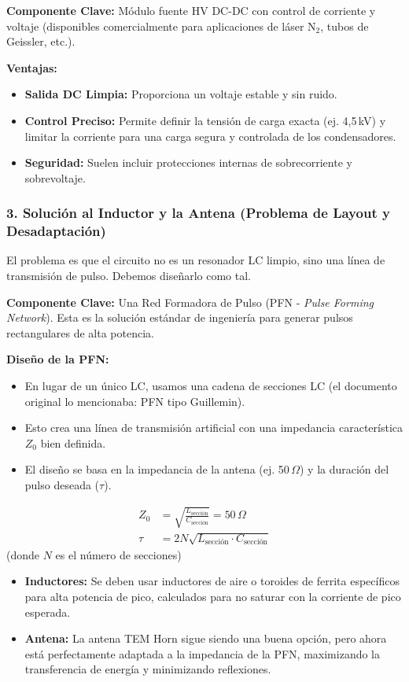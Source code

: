 \documentclass[12pt,a4paper]{article}
\begin{document}
\textbf{Componente Clave:} Módulo fuente HV DC-DC con control de corriente y voltaje (disponibles comercialmente para aplicaciones de láser $\text{N}_2$, tubos de Geissler, etc.).

\textbf{Ventajas:}
\begin{itemize}
    \item \textbf{Salida DC Limpia:} Proporciona un voltaje estable y sin ruido.
    \item \textbf{Control Preciso:} Permite definir la tensión de carga exacta (ej. 4,5\,kV) y limitar la corriente para una carga segura y controlada de los condensadores.
    \item \textbf{Seguridad:} Suelen incluir protecciones internas de sobrecorriente y sobrevoltaje.
\end{itemize}

\subsubsection{3. Solución al Inductor y la Antena (Problema de Layout y Desadaptación)}
El problema es que el circuito no es un resonador LC limpio, sino una línea de transmisión de pulso. Debemos diseñarlo como tal.

\textbf{Componente Clave:} Una Red Formadora de Pulso (PFN - \textit{Pulse Forming Network}). Esta es la solución estándar de ingeniería para generar pulsos rectangulares de alta potencia.

\textbf{Diseño de la PFN:}
\begin{itemize}
    \item En lugar de un único LC, usamos una cadena de secciones LC (el documento original lo mencionaba: PFN tipo Guillemin).
    \item Esto crea una línea de transmisión artificial con una impedancia característica $Z_0$ bien definida.
    \item El diseño se basa en la impedancia de la antena (ej. 50\,$\Omega$) y la duración del pulso deseada ($\tau$).
\end{itemize}
\begin{align}
    Z_0 &= \sqrt{\frac{L_{\text{sección}}}{C_{\text{sección}}}} = 50\,\Omega \\
    \tau &= 2N \sqrt{L_{\text{sección}} \cdot C_{\text{sección}}}
\end{align}
(donde $N$ es el número de secciones)

\begin{itemize}
    \item \textbf{Inductores:} Se deben usar inductores de aire o toroides de ferrita específicos para alta potencia de pico, calculados para no saturar con la corriente de pico esperada.
    \item \textbf{Antena:} La antena TEM Horn sigue siendo una buena opción, pero ahora está perfectamente adaptada a la impedancia de la PFN, maximizando la transferencia de energía y minimizando reflexiones.
\end{itemize}
\end{document}
